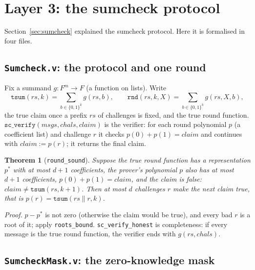 \documentclass[11pt,a4paper]{article}
\theoremstyle{definition}
\theoremstyle{plain}
\newtheorem{theorem}[definition]{Theorem}
\begin{document}
\section{Layer 3: the sumcheck protocol}
\label{sec:fm-sumcheck}

Section~\ref{sec:sumcheck} explained the sumcheck protocol. Here it is formalised in four files.

\subsection{\texttt{Sumcheck.v}: the protocol and one round}

Fix a summand $g:F^m\to F$ (a function on lists). Write
\[
  \mathtt{tsum}(rs,k)=\sum_{b\in\{0,1\}^k}g(rs,b),\qquad
  \mathtt{rnd}(rs,k,X)=\sum_{b\in\{0,1\}^k}g(rs,X,b),
\]
the true claim once a prefix $rs$ of challenges is fixed, and the true round function.
$\mathtt{sc\_verify}(\mathit{msgs},\mathit{chals},\mathit{claim})$ is the verifier: for each round
polynomial $p$ (a coefficient list) and challenge $r$ it checks $p(0)+p(1)=\mathit{claim}$ and
continues with $\mathit{claim}:=p(r)$; it returns the final claim.
\begin{theorem}[\texttt{round\_sound}]
Suppose the true round function has a representation $p^*$ with at most $d+1$ coefficients, the
prover's polynomial $p$ also has at most $d+1$ coefficients, $p(0)+p(1)=\mathit{claim}$, and the claim
is false: $\mathit{claim}\ne\mathtt{tsum}(rs,k+1)$. Then at most $d$ challenges $r$ make the next claim
true, that is $p(r)=\mathtt{tsum}(rs\|r,k)$.
\end{theorem}
\emph{Proof.} $p-p^*$ is not zero (otherwise the claim would be true), and every bad $r$ is a root
of it; apply \texttt{roots\_bound}. \texttt{sc\_verify\_honest} is completeness: if every message is
the true round function, the verifier ends with $g(rs,\mathit{chals})$.

\subsection{\texttt{SumcheckMask.v}: the zero-knowledge mask}
\end{document}
